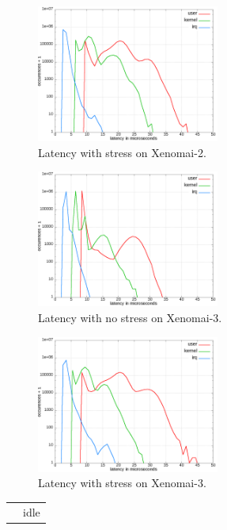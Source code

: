 \documentclass[10pt,a4paper]{article}
\begin{document}
\begin{multicols}{2}
\begin{figure}[H]
\begin{center}
\includegraphics[width=6cm]{img/x2-cpu.png}
\caption{Latency with stress on Xenomai-2.}
\label{x2-latency-stress}
\end{center}
\end{figure}
\begin{figure}[H]
\begin{center}
\includegraphics[width=6cm]{img/x3-idle.png}
\caption{Latency with no stress on Xenomai-3.}
\label{x3-latency-idle}
\end{center}
\end{figure}
\begin{figure}[H]
\begin{center}
\includegraphics[width=6cm]{img/x3-cpu.png}
\caption{Latency with stress on Xenomai-3.}
\label{x3-latency-stress}
\end{center}
\end{figure} 
\begin{tabular}{|l|r|r|r|}
\hline
\multirow{2}{*}{} & \multicolumn{3}{c|}{idle}  \\ \cline{2-4} 

\end{tabular}
\end{multicols}
\end{document}
